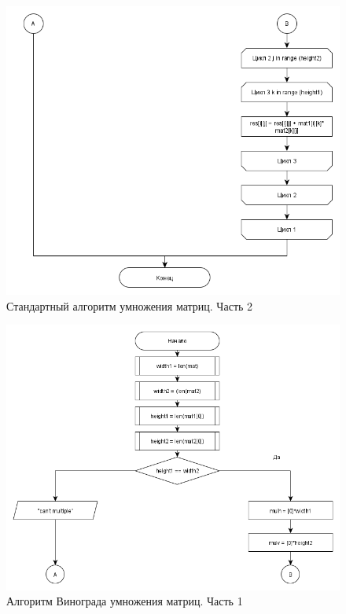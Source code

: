 \documentclass[a4paper,12pt]{report}
\begin{document}
	\newpage

	\begin{figure}[h!]
		\centering
		\includegraphics[width=0.8\linewidth]{basedab121.png}
		\caption{Стандартный алгоритм умножения матриц. Часть 2}
		\label{ris:std2}
	\end{figure}
	
	\newpage

	\begin{figure}[h!]
		\centering
		\includegraphics[width=1\linewidth]{part11.png}
		\caption{Алгоритм Винограда умножения матриц. Часть 1}
		\label{ris:wino1}
	\end{figure}
	
	\newpage
	
\end{document}

